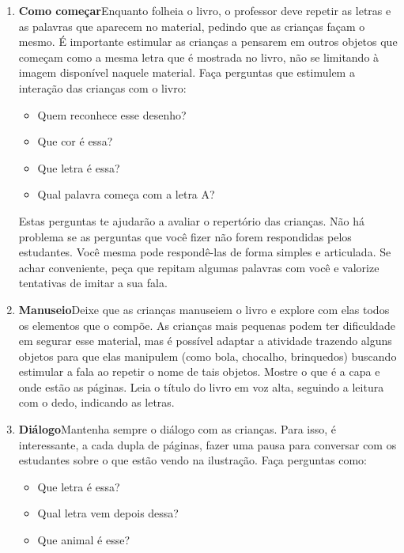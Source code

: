 \documentclass[11pt]{extarticle}
\begin{document}
\begin{enumerate}
\item \textbf{Como começar}\quad Enquanto folheia o livro, o professor deve repetir as letras e as palavras que aparecem no material, pedindo que as crianças façam o mesmo. É importante estimular as crianças a pensarem em outros objetos que começam como a mesma letra que é mostrada no livro, não se limitando à imagem disponível naquele material.
Faça perguntas que estimulem a interação das crianças com o livro:

\begin{itemize}
\item Quem reconhece esse desenho?
\item Que cor é essa?
\item Que letra é essa?
\item Qual palavra começa com a letra A?
\end{itemize}

Estas perguntas te ajudarão a avaliar o repertório das crianças. 
Não há problema se as perguntas que você fizer não forem respondidas pelos 
estudantes. Você mesma pode respondê-las de forma simples e articulada. Se achar 
conveniente, peça que repitam algumas palavras com você e valorize tentativas 
de imitar a sua fala. 

 
\item \textbf{Manuseio}\quad Deixe que as crianças manuseiem o livro 
e explore com elas todos os elementos que o compõe.
As crianças mais pequenas podem ter dificuldade em segurar esse material, mas é possível adaptar a atividade trazendo alguns objetos para que elas manipulem (como bola, chocalho, brinquedos) buscando estimular a fala ao repetir o nome de tais objetos. 
Mostre o que é a 
capa e onde estão as páginas. Leia o título do livro em voz alta, seguindo 
a leitura com o dedo, indicando as letras. 

\item \textbf{Diálogo}\quad Mantenha sempre o diálogo com as crianças. Para isso, é interessante, a cada dupla de páginas, fazer uma 
pausa para conversar com os estudantes sobre o que estão vendo na ilustração. 
Faça perguntas como: 

\begin{itemize}
\item Que letra é essa?
\item Qual letra vem depois dessa?
\item Que animal é esse?
\end{itemize}


\end{enumerate}
\end{document}
